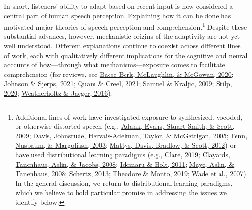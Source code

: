 \documentclass[
  11pt,
  english,
  man,floatsintext]{apa6}
\begin{document}
In short, listeners' ability to adapt based on recent input is now considered a central part of human speech perception. Explaining how it can be done has motivated major theories of speech perception and comprehension.\footnote{Additional lines of work have investigated exposure to synthesized, vocoded, or otherwise distorted speech (e.g., \protect\hyperlink{ref-adank2009}{Adank, Evans, Stuart-Smith, \& Scott, 2009}; \protect\hyperlink{ref-davis2005}{Davis, Johnsrude, Hervais-Adelman, Taylor, \& McGettigan, 2005}; \protect\hyperlink{ref-fenn2003}{Fenn, Nusbaum, \& Margoliash, 2003}; \protect\hyperlink{ref-mattys2012}{Mattys, Davis, Bradlow, \& Scott, 2012}) or have used distributional learning paradigms (e.g., \protect\hyperlink{ref-clare2019}{Clare, 2019}; \protect\hyperlink{ref-clayards2008}{Clayards, Tanenhaus, Aslin, \& Jacobs, 2008}; \protect\hyperlink{ref-idemaru-holt2011}{Idemaru \& Holt, 2011}; \protect\hyperlink{ref-maye2008}{Maye, Aslin, \& Tanenhaus, 2008}; \protect\hyperlink{ref-schertz2013}{Schertz, 2013}; \protect\hyperlink{ref-theodore-monto2019}{Theodore \& Monto, 2019}; \protect\hyperlink{ref-wade2007}{Wade et al., 2007}). In the general discussion, we return to distributional learning paradigms, which we believe to hold particular promise in addressing the issues we identify below.} Despite these substantial advances, however, mechanistic origins of the adaptivity are not yet well understood. Different explanations continue to coexist across different lines of work, each with qualitatively different implications for the cognitive and neural accounts of how---through what mechanisms---exposure comes to facilitate comprehension (for reviews, see \protect\hyperlink{ref-baeseberk2020}{Baese-Berk, McLaughlin, \& McGowan, 2020}; \protect\hyperlink{ref-johnson-sjerps2021}{Johnson \& Sjerps, 2021}; \protect\hyperlink{ref-quam-creel2021}{Quam \& Creel, 2021}; \protect\hyperlink{ref-samuel-kraljic2009}{Samuel \& Kraljic, 2009}; \protect\hyperlink{ref-stilp2020}{Stilp, 2020}; \protect\hyperlink{ref-weatherholtz-jaeger2016}{Weatherholtz \& Jaeger, 2016}).
\end{document}
